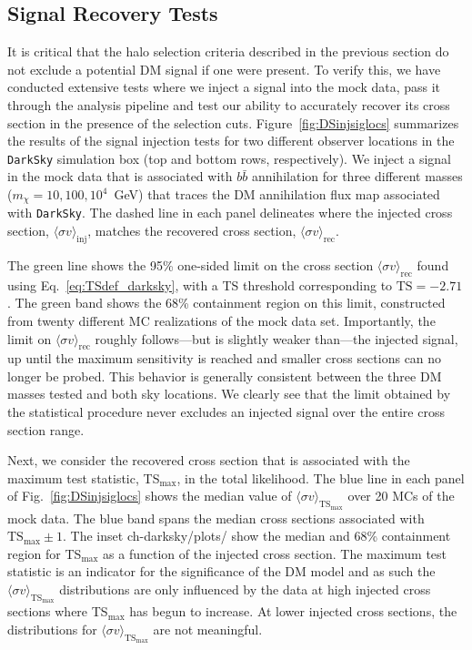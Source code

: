 \subsection{Signal Recovery Tests}
\label{sec:siginj}
 
 It is critical that the halo selection criteria described in the previous section do not exclude a potential DM signal if one were present. To verify this, we have conducted extensive tests where we inject a signal into the mock data, pass it through the analysis pipeline and test our ability to accurately recover its cross section in the presence of the selection cuts.  Figure~\ref{fig:DSinjsiglocs} summarizes the results of the signal injection tests for two different observer locations in the \texttt{DarkSky} simulation box (top and bottom rows, respectively).  We inject a signal in the mock data that is associated with $b\bar{b}$ annihilation for three different masses ($m_\chi = 10, 100, 10^4$~GeV) that traces the DM annihilation flux map associated with \texttt{DarkSky}. The dashed line in each panel delineates where the injected cross section, $\langle \sigma v \rangle_\text{inj}$, matches the recovered cross section, $\langle \sigma v \rangle_\text{rec}$.  

The green line shows the 95\% one-sided limit on the cross section $\langle \sigma v \rangle_\text{rec}$ found using Eq.~\ref{eq:TSdef_darksky}, with a TS threshold corresponding to $\text{TS} = -2.71$.  The green band shows the 68\% containment region on this limit, constructed from twenty different MC realizations of the mock data set.  Importantly, the limit on $\langle \sigma v \rangle_\text{rec}$ roughly follows---but is slightly weaker than---the injected signal, up until the maximum sensitivity is reached and smaller cross sections can no longer be probed.  This behavior is generally consistent between the three DM masses tested and both sky locations.  We clearly see that the limit obtained by the statistical procedure never excludes an injected signal over the entire cross section range. 

Next, we consider the recovered cross section that is associated with the maximum test statistic, TS$_\text{max}$, in the total likelihood. The blue line in each panel of Fig.~\ref{fig:DSinjsiglocs} shows the median value of $\langle \sigma v\rangle_{\text{TS}_\text{max}}$ over 20 MCs of the mock data.  The blue band spans the median cross sections associated with $\text{TS}_\text{max}\pm1$.  The inset ch-darksky/plots/ show the median and 68\% containment region for TS$_\text{max}$ as a function of the injected cross section.  The maximum test statistic is an indicator for the significance of the DM model and as such the $\langle \sigma v\rangle_{\text{TS}_\text{max}}$ distributions are only influenced by the data at high injected cross sections where TS$_\text{max}$ has begun to increase.  At lower injected cross sections, the distributions for $\langle \sigma v\rangle_{\text{TS}_\text{max}}$ are not meaningful.  

